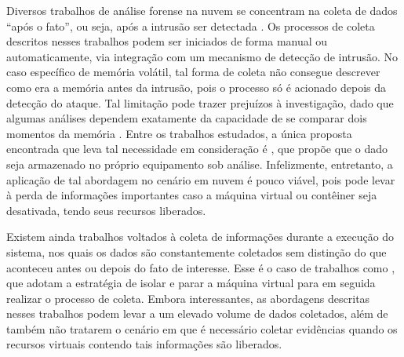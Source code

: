 Diversos trabalhos de análise forense na nuvem se concentram na coleta de dados ``após o fato'', ou seja, após a intrusão ser detectada \cite{ReichertAutoAcquisition:2015,PoiselVMI:2013,DykstraFROST:2013,GeorgeDF2CE:2012,SangLogApproach:2013}. 
%
Os processos de coleta descritos nesses trabalhos podem ser iniciados de forma manual ou automaticamente, via integração com um mecanismo de detecção de intrusão. 
%
No caso específico de memória volátil, tal forma de coleta não consegue descrever como era a memória antes da intrusão, pois o processo só é acionado depois da detecção do ataque. 
%
Tal limitação pode trazer prejuízos à investigação, dado que algumas análises dependem exatamente da capacidade de se comparar dois momentos da memória \cite{CaseMemoryForensics:2014}. 
%
Entre os trabalhos estudados, a única proposta encontrada que leva tal necessidade em consideração é \cite{DezfouliBackupApproach:2012}, que propõe que o dado seja armazenado no próprio equipamento sob análise.
%
Infelizmente, entretanto, a aplicação de tal abordagem no cenário em nuvem é pouco viável, pois pode levar à perda de informações importantes caso a máquina virtual ou contêiner seja desativada, tendo seus recursos liberados.
%

Existem ainda trabalhos voltados à coleta de informações durante a execução do sistema, nos quais os dados são constantemente coletados sem distinção do que aconteceu antes ou depois do fato de interesse.
%
Esse é o caso de trabalhos como \cite{PoiselVMI:2013,DykstraFROST:2013,SangLogApproach:2013,Dolan-GavittSemanticGap:2011}, que adotam a estratégia de isolar e parar a máquina virtual para em seguida realizar o processo de coleta. 
%
Embora interessantes, as abordagens descritas nesses trabalhos podem levar a um elevado volume de dados coletados, além de também não tratarem o cenário em que é necessário coletar evidências quando os recursos virtuais contendo tais informações são liberados.


